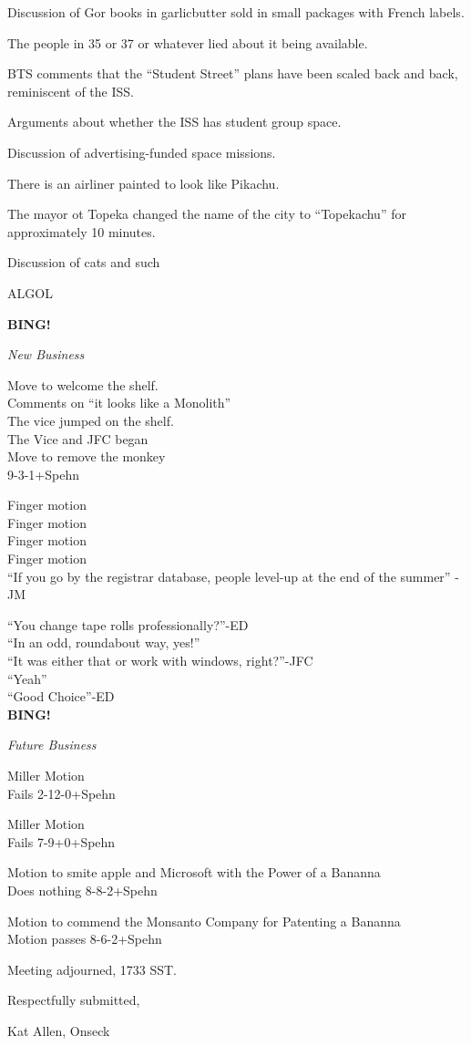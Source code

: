 \documentclass[12pt]{article}
\newcommand{\bing}{{\bf BING!} }
\newcommand{\goto}[1]{\bing \vskip 12pt \centerline{{\em{#1}}}}
\begin{document}
Discussion of Gor books in garlicbutter sold in small packages with
French labels.

The people in 35 or 37 or whatever lied about it being available.

BTS comments that the ``Student Street'' plans have been scaled back
and back, reminiscent of the ISS.

Arguments about whether the ISS has student group space.

Discussion of advertising-funded space missions.

There is an airliner painted to look like Pikachu.

The mayor ot Topeka changed the name of the city to ``Topekachu'' for
approximately 10 minutes.

Discussion of cats and such

ALGOL

\goto{New Business}
Move to welcome the shelf.\\
Comments on ``it looks like a Monolith''\\
The vice jumped on the shelf.\\
The Vice and JFC began\\
Move to remove the monkey\\
9-3-1+Spehn

Finger motion\\
Finger motion\\
Finger motion\\
Finger motion\\

``If you go by the registrar database, people level-up at the end of
the summer'' -JM

``You change tape rolls professionally?''-ED\\
``In an odd, roundabout way, yes!'' \\
``It was either that or work with windows, right?''-JFC\\
``Yeah''\\
``Good Choice''-ED\\

\goto{Future Business}
Miller Motion\\
Fails 2-12-0+Spehn

Miller Motion\\
Fails 7-9+0+Spehn

Motion to smite apple and Microsoft with the Power of a Bananna\\
Does nothing 8-8-2+Spehn

Motion to commend the Monsanto Company for Patenting a Bananna\\
Motion passes 8-6-2+Spehn
\vspace{12pt}

\noindent
Meeting adjourned, 1733 SST.

\vspace{18pt}

\centerline{Respectfully submitted,}
\centerline{Kat Allen,  Onseck}
\end{document}
